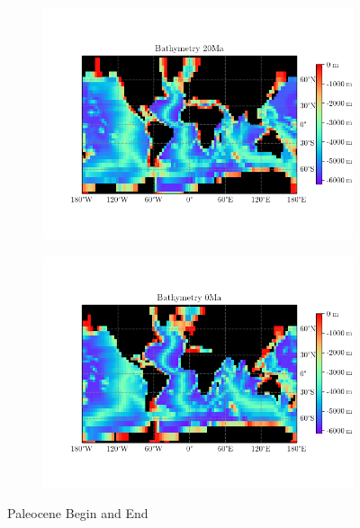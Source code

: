 \documentclass[a4paper]{article}
\begin{document}
\begin{figure}[H]
\begin{subfigure}{.5\textwidth}
	\label{fig:paleo_end}
\end{subfigure}
\begin{subfigure}{.5\textwidth}
	\centering
	\includegraphics[width=0.9\linewidth]{bathymetry/baath_20.png}
	\label{fig:paleo_end}
\end{subfigure}
\begin{subfigure}{.5\textwidth}
	\centering
	\includegraphics[width=0.9\linewidth]{bathymetry/baath_0.png}
	\label{fig:paleo_end}
\end{subfigure}
\caption{Paleocene Begin and End}
\label{fig:paleocene_bath}

\end{figure}
\end{document}
